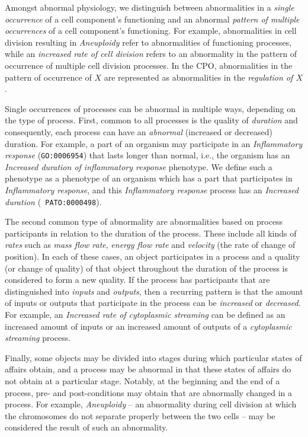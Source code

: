\documentclass{bioinfo}
\begin{document}
Amongst abnormal physiology, we distinguish between abnormalities in a
{\em single occurrence} of a cell component's functioning and an
abnormal {\em pattern of multiple occurrences} of a cell component's
functioning. For example, abnormalities in cell division resulting in
{\em Aneuploidy} refer to abnormalities of functioning processes,
while an {\em increased rate of cell division} refers to an
abnormality in the pattern of occurrence of multiple cell division
processes. In the CPO, abnormalities in the pattern of occurrence of
$X$ are represented as abnormalities in the {\em regulation of $X$}.

Single occurrences of processes can be abnormal in multiple ways,
depending on the type of process.
%
First, common to all processes is the quality of {\em duration} and
consequently, each process can have an {\em abnormal} (increased or
decreased) duration. For example, a part of an organism may
participate in an {\em Inflammatory response} ({\tt GO:0006954}) that
lasts longer than normal, i.e., the organism has an {\em Increased
  duration of inflammatory response} phenotype. We define such a
phenotype as a phenotype of an organism which has a part that
participates in {\em Inflammatory response}, and this {\em
  Inflammatory response} process has an {\em Increased duration} ({\tt
  PATO:0000498}).

The second common type of abnormality are abnormalities based on
process participants in relation to the duration of the process. These
include all kinds of {\em rates} such as {\em mass flow rate}, {\em
  energy flow rate} and {\em velocity} (the rate of change of
position). In each of these cases, an object participates in a process
and a quality (or change of quality) of that object throughout the
duration of the process is considered to form a new quality. If the
process has participants that are distinguished into {\em inputs} and
{\em outputs}, then a recurring pattern is that the amount of inputs
or outputs that participate in the process can be {\em increased} or
{\em decreased}. For example, an {\em Increased rate of cytoplasmic
  streaming} can be defined as an increased amount of inputs or an
increased amount of outputs of a {\em cytoplasmic streaming} process.

Finally, some objects may be divided into stages during which
particular states of affairs obtain, and a process may be abnormal in
that these states of affairs do not obtain at a particular
stage. Notably, at the beginning and the end of a process, pre- and
post-conditions may obtain that are abnormally changed in a
process. For example, {\em Aneuploidy} -- an abnormality during cell
division at which the chromosomes do not separate properly between the
two cells -- may be considered the result of such an abnormality.
\end{document}

